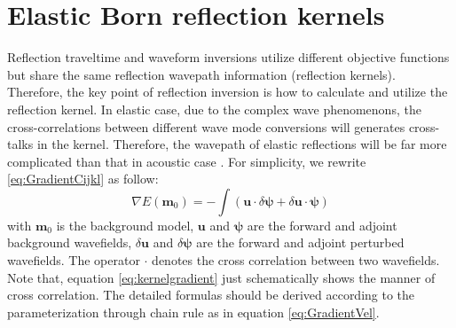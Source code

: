 \section{Elastic Born reflection kernels}
Reflection traveltime and waveform inversions utilize different objective functions
but share the same reflection wavepath information (reflection kernels). 
Therefore, the key point of reflection inversion is how to calculate and utilize the reflection kernel. 
In elastic case, due to the complex wave phenomenons, the cross-correlations between
different wave mode conversions will generates cross-talks in the kernel. Therefore, the wavepath of elastic reflections will 
be far more complicated than that in acoustic case \cite[]{Wang2017}.
For simplicity, we rewrite \eqref{eq:GradientCijkl} as follow:
\begin{equation}
    \nabla E(
    \mathbf{m}_0)=-\int(
    \mathbf{u}\cdot\delta \boldsymbol{\psi}
    +\delta
    \mathbf{u}\cdot{\boldsymbol{\psi}})
    \label{eq:kernelgradient} 
\end{equation} 
with $\mathbf{m}_0$ is the background model, $\mathbf{u}$ and $\boldsymbol{\psi}$ are the forward and adjoint background wavefields,
$\delta\mathbf{u}$ and $\delta \boldsymbol{\psi}$ are the forward and adjoint perturbed wavefields.
The operator $\cdot$ denotes the cross correlation between two wavefields. 
Note that, equation \eqref{eq:kernelgradient} just schematically shows the manner of cross correlation. 
The detailed formulas should be derived according to the parameterization through
chain rule as in equation \eqref{eq:GradientVel}.

